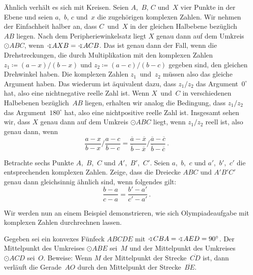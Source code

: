 Ähnlich verhält es sich mit Kreisen. Seien $A$,~$B$, $C$ und~$X$ vier Punkte in der Ebene und seien $a$,~$b$, $c$ und~$x$ die zugehörigen komplexen Zahlen. Wir nehmen der Einfachheit halber an, dass $C$~und~$X$ in der gleichen Halbebene bezüglich~$AB$ liegen. Nach dem Peripheriewinkelsatz liegt $X$ genau dann auf dem Umkreis $\odot ABC$, wenn $\winkel AXB=\winkel ACB$. Das ist genau dann der Fall, wenn die Drehstreckungen, die durch Multiplikation mit den komplexen Zahlen $z_1\coloneqq (a-x)/(b-x)$ und $z_2\coloneqq (a-c)/(b-c)$ gegeben sind, den gleichen Drehwinkel haben. Die komplexen Zahlen $z_1$~und~$z_2$ müssen also das gleiche Argument haben. Das wiederum ist äquivalent dazu, dass $z_1/z_2$ das Argument~$0^\circ$ hat, also eine nichtnegative reelle Zahl ist. Wenn $X$~und~$C$ in verschiedenen Halbebenen bezüglich~$AB$ liegen, erhalten wir analog die Bedingung, dass $z_1/z_2$ das Argument~$180^\circ$ hat, also eine nichtpositive reelle Zahl ist. Insgesamt sehen wir, dass $X$ genau dann auf dem Umkreis $\odot ABC$ liegt, wenn $z_1/z_2$ reell ist, also genau dann, wenn
\begin{equation*}
	\frac{a-x}{b-x}\bigg/\frac{a-c}{b-c}=\frac{\overline{a}-\overline{x}}{\overline{b}-\overline{x}}\bigg/\frac{\overline{a}-\overline{c}}{\overline{b}-\overline{c}}\,.
\end{equation*}

\begin{aufgabe*}
	Betrachte sechs Punkte $A$,~$B$,~$C$ und $A'$,~$B'$,~$C'$. Seien $a$,~$b$,~$c$ und $a'$,~$b'$,~$c'$ die entsprechenden komplexen Zahlen. Zeige, dass die Dreiecke $ABC$ und $A'B'C'$ genau dann gleichsinnig ähnlich sind, wenn folgendes gilt:
	\begin{equation*}
		\frac{b-a}{c-a}=\frac{b'-a'}{c'-a'}\,.
	\end{equation*}
\end{aufgabe*}

Wir werden nun an einem Beispiel demonstrieren, wie sich Olympiadeaufgabe mit komplexen Zahlen durchrechnen lassen.

\begin{aufgabe*}
	Gegeben sei ein konvexes Fünfeck $ABCDE$ mit $\winkel CBA=\winkel AED=90^\circ$. Der Mittelpunkt des Umkreises $\odot ABE$ sei~$M$ und der Mittelpunkt des Umkreises $\odot ACD$ sei~$O$. Beweise: Wenn $M$ der Mittelpunkt der Strecke~$\overline{CD}$ ist, dann verläuft die Gerade~$AO$ durch den Mittelpunkt der Strecke~$\overline{BE}$.
\end{aufgabe*}

